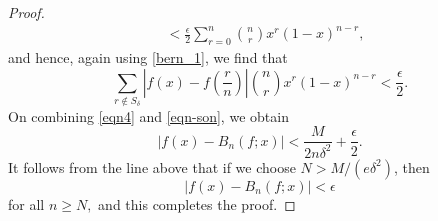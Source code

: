 \documentclass[12pt]{article}
\begin{document}
\begin{proof}
\begin{align*}
        &<\frac{\epsilon}{2} \sum_{r=0}^n\binom{n}{r}x^r(1-x)^{n-r},
   \end{align*}
   and hence, again using \eqref{bern_1}, we find that
   \begin{equation}
       \sum_{r\notin S_\delta}\left|f(x)-f\left(\frac{r}{n}\right)\right|\binom{n}{r}x^r(1-x)^{n-r}<\frac{\epsilon}{2}.
       \label{eqn-son}
   \end{equation}
   On combining \eqref{eqn4} and \eqref{eqn-son}, we obtain
   \begin{equation*}
       |f(x) - B_n(f;x)| < \frac{M}{2n\delta^2} + \frac{\epsilon}{2}.
   \end{equation*}
   It follows from the line above that if we choose $N>M/(e\delta^2)$, then
   \begin{equation*}
       |f(x) - B_n(f;x)| < \epsilon
   \end{equation*}
   for all $n\geq N,$ and this completes the proof.
\end{proof}
\newpage
\nocite{*}
\printbibliography
\end{document}
